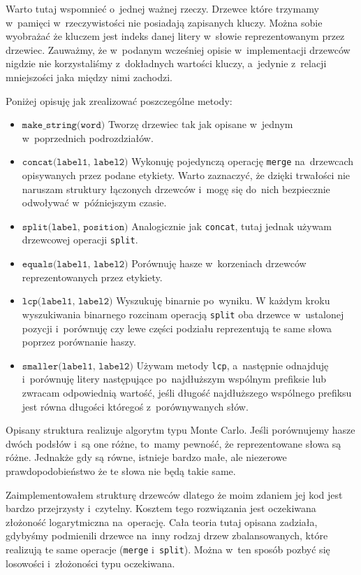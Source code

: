 \documentclass[declaration,shortabstract]{iithesis}
\theoremstyle{definition} \newtheorem{definition}{Definicja}[chapter]
\theoremstyle{remark} \newtheorem{remark}[definition]{Obserwacja}
\theoremstyle{plain} \newtheorem{theorem}[definition]{Twierdzenie}
\theoremstyle{remark} \newtheorem{example}{Przykład}[definition]
\theoremstyle{plain} \newtheorem{lemma}[definition]{Lemat}
\begin{document}
Warto tutaj wspomnieć o~jednej ważnej rzeczy. Drzewce które trzymamy w~pamięci w~rzeczywistości nie posiadają zapisanych kluczy. Można sobie wyobrażać że kluczem jest indeks danej litery w~słowie reprezentowanym przez drzewiec. Zauważmy, że w~podanym wcześniej opisie w~implementacji drzewców nigdzie nie korzystaliśmy z~dokładnych wartości kluczy, a~jedynie z~relacji mniejszości jaka między nimi zachodzi.

Poniżej opisuję jak zrealizować poszczególne metody:
\begin{itemize}
    \item $\texttt{make\_string(word)}$ Tworzę drzewiec tak jak opisane w~jednym w~poprzednich podrozdziałów.
    \item $\texttt{concat(label1, label2)}$ Wykonuję pojedynczą operację \texttt{merge} na~drzewcach opisywanych przez podane etykiety. Warto zaznaczyć, że dzięki trwałości nie naruszam struktury łączonych drzewców i~mogę się do~nich bezpiecznie odwoływać w~późniejszym czasie.
    \item $\texttt{split(label, position)}$ Analogicznie jak \texttt{concat}, tutaj jednak używam drzewcowej operacji \texttt{split}.
    \item $\texttt{equals(label1, label2)}$ Porównuję hasze w~korzeniach drzewców reprezentowanych przez etykiety.
    \item $\texttt{lcp(label1, label2)}$ Wyszukuję binarnie po~wyniku. W każdym kroku wyszukiwania binarnego rozcinam operacją \texttt{split} oba drzewce w~ustalonej pozycji i~porównuję czy lewe części podziału reprezentują te same słowa poprzez porównanie haszy.
    \item $\texttt{smaller(label1, label2)}$ Używam metody \texttt{lcp}, a~następnie odnajduję i~porównuję litery następujące po~najdłuższym wspólnym prefiksie lub zwracam odpowiednią wartość, jeśli długość najdłuższego wspólnego prefiksu jest równa długości któregoś z~porównywanych słów.
\end{itemize}

Opisany struktura realizuje algorytm typu Monte Carlo. Jeśli porównujemy hasze dwóch podsłów i~są one różne, to~mamy pewność, że reprezentowane słowa są różne. Jednakże gdy są równe, istnieje bardzo małe, ale niezerowe prawdopodobieństwo że te słowa nie będą takie same.

Zaimplementowałem strukturę drzewców dlatego że moim zdaniem jej kod jest bardzo przejrzysty i~czytelny. Kosztem tego rozwiązania jest oczekiwana złożoność logarytmiczna na~operację. Cała teoria tutaj opisana zadziała, gdybyśmy podmienili drzewce na~inny rodzaj drzew zbalansowanych, które realizują te same operacje (\texttt{merge} i~\texttt{split}). Można w~ten sposób pozbyć się losowości i~złożoności typu oczekiwana.
\end{document}
